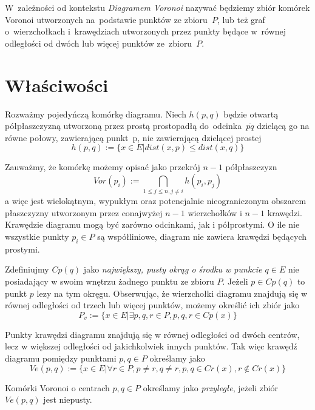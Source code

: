 \documentclass[skorowidz,autorrok,backref,xodstep,oswiadczenie]{wmimgr}
\begin{document}
W~zależności od kontekstu \emph{Diagramem Voronoi} nazywać będziemy zbiór komórek Voronoi utworzonych na~podstawie punktów ze zbioru~$P$, lub też graf o~wierzchołkach i~krawędziach utworzonych przez punkty będące w~równej odległości od dwóch lub więcej punktów ze~zbioru~$P$.

\section{Właściwości}

Rozważmy pojedyńczą komórkę diagramu. Niech $h(p,q)$ będzie otwartą półpłaszczyzną utworzoną przez prostą prostopadłą do~odcinka~$\overline{pq}$ dzielącą go na równe połowy, zawierającą punkt~p, nie zawierającą dzielącej prostej
\begin{equation}
h(p,q) := \{ x \in E | dist(x,p) \leq dist(x,q) \}
\end{equation}

Zauważmy, że komórkę możemy opisać jako przekrój $n-1$ półpłaszczyzn
\begin{equation}
Vor(p_{i}) := \bigcap_{1 \leq j \leq n, j \neq i} h(p_{i},p_{j})
\end{equation}
a więc jest wielokątnym, wypukłym oraz potencjalnie nieograniczonym obszarem płaszczyzny utworzonym przez conajwyżej $n-1$ wierzchołków i $n-1$ krawędzi. Krawędzie diagramu mogą być zarówno odcinkami, jak i półprostymi. O ile nie wszystkie punkty $p_{i} \in P$ są współliniowe, diagram nie zawiera krawędzi będących prostymi.

Zdefiniujmy $Cp(q)$ jako \emph{największy, pusty okrąg o środku w punkcie $q \in E$} nie posiadający w swoim wnętrzu żadnego punktu ze zbioru $P$. Jeżeli $p \in Cp(q)$ to punkt $p$ lezy na tym okręgu.
Obserwując, że wierzchołki diagramu znajdują się w równej odległości od trzech lub więcej punktów, możemy określić ich zbiór jako
\begin{equation}
P_{v} := \{ x \in E | \exists p,q,r \in P, p,q,r \in Cp(x) \}
\end{equation}

Punkty krawędzi diagramu znajdują się w równej odległości od dwóch centrów, lecz w większej odległości od jakichkolwiek innych punktów. Tak więc krawędź diagramu pomiędzy punktami $p,q \in P$ określamy jako
\begin{equation}
Ve(p,q) := \{ x \in E | \forall r \in P, p \neq r, q \neq r, p,q \in Cr(x), r \notin Cr(x) \}
\end{equation}

Komórki Voronoi o centrach $p,q \in P$ określamy jako \emph{przyległe}, jeżeli zbiór $Ve(p,q)$ jest niepusty.
\end{document}
